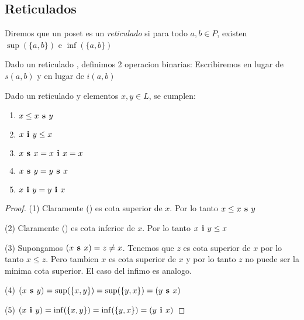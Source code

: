 \subsection{Reticulados}
\begin{definition}
  Diremos que un poset \poset es un \emph{reticulado} si para todo $a, b \in P$, existen $\sup(\{a, b\})$ e $\inf(\{a, b\})$
\end{definition}

\begin{definition}
  Dado un reticulado \poset, definimos 2 operacion binarias:
Escribiremos  en lugar de $s(a, b)$ y  en lugar de $i(a, b)$
\end{definition}

\begin{lemma}
  Dado un reticulado \reticul y elementos $x, y \in L$, se cumplen:
  \begin{enumerate}
    \item $x \leq x\textbf{ s }y$
    \item $x\textbf{ i }y \leq x$
    \item $x\textbf{ s }x = x\textbf{ i }x = x$
    \item $x\textbf{ s }y = y\textbf{ s }x$
    \item $x\textbf{ i }y = y\textbf{ i }x$ 
  \end{enumerate}
\end{lemma}
\begin{proof}
  (1) Claramente () es cota superior de $x$. Por lo tanto $x \leq x\textbf{ s }y$
  
  (2) Claramente () es cota inferior de $x$. Por lo tanto $x\textbf{ i }y \leq x$
  
  (3) Supongamos $(x\textbf{ s }x) = z \neq x$. Tenemos que $z$ es cota superior de $x$ por lo tanto $x \leq z$.
  Pero tambien $x$ es cota superior de $x$ y por lo tanto $z$ no puede ser la minima cota superior. El caso del infimo es analogo.

  (4) $(x\textbf{ s }y) = \sup(\{x, y\}) = \sup(\{y, x\}) = (y\textbf{ s }x)$

  (5) $(x\textbf{ i }y) = \inf(\{x, y\}) = \inf(\{y, x\}) = (y\textbf{ i }x)$
\end{proof}

